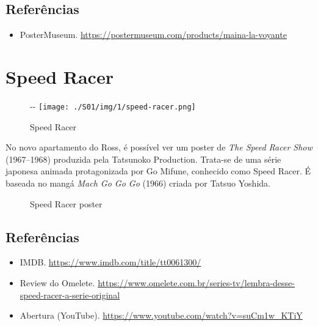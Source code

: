 \hypertarget{referuxeancias-3}{%
\subsection{Referências}\label{referuxeancias-3}}

\begin{itemize}
\tightlist
\item
  \sloppy PosterMuseum. \url{https://postermuseum.com/products/maina-la-voyante}
\end{itemize}

\hypertarget{speed-racer}{%
\section{Speed Racer}\label{speed-racer}}

\begin{figure}[!ht]
  \begin{adjustwidth}{-\oddsidemargin-1in}{-\rightmargin}
    \centering
    \texttt{[image: ./S01/img/1/speed-racer.png]}
    \caption{Speed Racer\label{fig:speed-racer}}
  \end{adjustwidth}
\end{figure}

No novo apartamento do Ross, é possível ver um poster de \emph{The Speed
Racer Show} (1967--1968) produzida pela Tatsunoko Production. Trata-se
de uma série japonesa animada protagonizada por Go Mifune, conhecido
como Speed Racer. É baseada no mangá \emph{Mach Go Go Go} (1966) criada
por Tatsuo Yoshida.

\begin{figure}
  \centering
    \caption{Speed Racer poster\label{fig:speed-racer-poster}}
\end{figure}

\hypertarget{referuxeancias-4}{%
\subsection{Referências}\label{referuxeancias-4}}

\begin{itemize}
\tightlist
\item
  \sloppy IMDB. \url{https://www.imdb.com/title/tt0061300/}
\item
  \sloppy Review do Omelete. \url{https://www.omelete.com.br/series-tv/lembra-desse-speed-racer-a-serie-original}
\item
  \sloppy Abertura (YouTube). \url{https://www.youtube.com/watch?v=suCm1w_KTiY}
\end{itemize}

